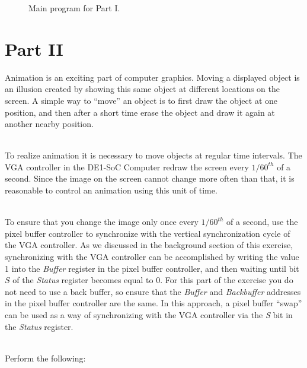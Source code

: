 \documentclass[epsfig,10pt,fullpage]{article}
\begin{document}
\begin{figure}[th]
\centering

\caption{Main program for Part I.}
\label{fig:main1}
\end{figure}

\newpage
\section*{Part II}
Animation is an exciting part of computer graphics. Moving a displayed object is an illusion 
created by showing this same object at different locations on the screen. A simple way to
``move'' an object is to first draw the object at one position, and then after a short time erase 
the object and draw it again at another nearby position.

~\\
To realize animation it is necessary to move objects at regular time intervals. The VGA controller 
in the DE1-SoC Computer redraw the screen every $1/60^{th}$ of a second. Since the image on 
the screen cannot change more often than that, it is reasonable to control an animation
using this unit of time.

~\\
To ensure that you change the image only once every $1/60^{th}$ of a second, use the 
pixel buffer controller to synchronize with the vertical synchronization cycle of the VGA 
controller. As we discussed in the background section of this exercise, synchronizing with the 
VGA controller can be accomplished by writing the value 1 into the {\it Buffer} register in the 
pixel buffer controller, and then waiting until bit $S$ of the {\it Status} register becomes 
equal to 0. For this part of the exercise you do not need to use a back buffer, so ensure
that the {\it Buffer} and {\it Backbuffer} addresses in the pixel buffer controller are the 
same. In this approach, a pixel buffer ``swap'' can be used as a way of synchronizing with 
the VGA controller via the {\it S} bit in the {\it Status} register.

~\\
Perform the following:
\end{document}

